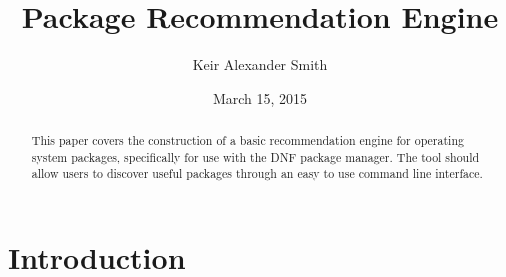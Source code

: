 \documentclass{l4proj}
\begin{document}
\title{Package Recommendation Engine}
\author{Keir Alexander Smith}
\date{March 15, 2015}
\maketitle
 
\begin{abstract}
This paper covers the construction of a basic recommendation engine for operating system packages, specifically for use with the DNF package manager. The tool should allow users to discover useful packages through an easy to use command line interface.
\end{abstract}
 
\tableofcontents

\lstset{ %
language=Python,              %
basicstyle=\scriptsize,     %
numbers=left,               %
numberstyle=\scriptsize,    %
numbersep=10pt,             %
frame=trBL,                 %
captionpos=b,               %
breaklines=true,            %
breakatwhitespace=false,    %
showstringspaces=false,     %
frameround=fttt
}
 
 
\chapter{Introduction}
 
\end{document}
